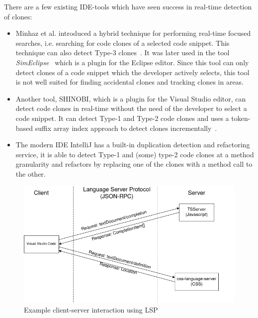 There are a few existing IDE-tools which have seen success in real-time detection of clones:

\begin{itemize}

	\item Minhaz et al. introduced a hybrid technique for performing real-time focused
	      searches, i.e. searching for code clones of a selected code snippet. This
	      technique can also detect Type-3 clones~\cite{Zibran_real_time_search}. It was
	      later used in the tool
	      \textit{SimEclipse}~\cite{Udding_Towards_Convenient_Management} which is a plugin
	      for the Eclipse editor. Since this tool can only detect clones of a code snippet
	      which the developer actively selects, this tool is not well suited for finding
	      accidental clones and tracking clones in areas.

	\item Another tool, SHINOBI, which is a plugin for the Visual Studio editor, can
	      detect code clones in real-time without the need of the developer to select a code
	      snippet. It can detect Type-1 and Type-2 code clones and uses a token-based suffix
	      array index approach to detect clones incrementally~\cite{SHINOBI}.

	\item The modern IDE IntelliJ has a built-in duplication detection and refactoring
	      service, it is able to detect Type-1 and (some) type-2 code clones at a method
	      granularity and refactors by replacing one of the clones with a method call to the
	      other.

\end{itemize}

\begin{figure}[t]
	\includegraphics[width=\textwidth]{images/lspcommunication.png}
	\caption{Example client-server interaction using LSP}
	\label{fig:lspcommunication}
\end{figure}

